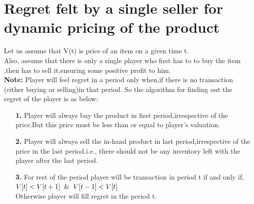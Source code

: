 \documentclass[10pt,a4paper,oneside]{report}
\begin{document}
\section{Regret felt by a single seller for dynamic pricing of the product}
Let us assume that V(t) is price of an item on a given time t.\\
\noindent Also, assume that there is only a single player who first has to to buy the item ,then has to sell it,ensuring some positive profit to him.\\
\noindent \textbf{Note:} Player will feel regret in a period only when,if there is no transaction (either buying or selling)in that period.
So the algorithm for finding out the regret of the player is as below:\citep{gjerstad1998price}
\begin{enumerate}
\item[\textbf{1.}] Player will always buy the product in first period,irrespective of the price.But this price must be less than or equal to player's valuation.
\item[\textbf{2.}] Player will always sell the in-hand product in last period,irrespective of the price in the last period.i.e., there should not be any inventory left with the player after the last period.
\item[\textbf{3.}] For rest of the period player will be transaction in period t if and only if,\\
$V[t]<V[t+1]\hspace*{2mm} \& \hspace*{2mm}V[t-1]<V[t]$\\
\noindent Otherwise player will fill regret in the period t.
\end{enumerate}
\end{document}

